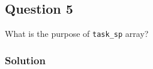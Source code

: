 \subsection*{Question 5}

What is the purpose of \texttt{task\_sp} array?

\subsubsection*{Solution}
